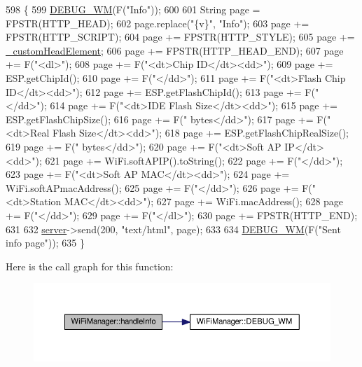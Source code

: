 \begin{DoxyCode}
598                              \{
599   \hyperlink{class_wi_fi_manager_ae5f595c670ccbcf9a191baf50f5c7c26}{DEBUG\_WM}(F(\textcolor{stringliteral}{"Info"}));
600 
601   String page = FPSTR(HTTP\_HEAD);
602   page.replace(\textcolor{stringliteral}{"\{v\}"}, \textcolor{stringliteral}{"Info"});
603   page += FPSTR(HTTP\_SCRIPT);
604   page += FPSTR(HTTP\_STYLE);
605   page += \hyperlink{class_wi_fi_manager_a8860012564a62209d750c50e56319192}{\_customHeadElement};
606   page += FPSTR(HTTP\_HEAD\_END);
607   page += F(\textcolor{stringliteral}{"<dl>"});
608   page += F(\textcolor{stringliteral}{"<dt>Chip ID</dt><dd>"});
609   page += ESP.getChipId();
610   page += F(\textcolor{stringliteral}{"</dd>"});
611   page += F(\textcolor{stringliteral}{"<dt>Flash Chip ID</dt><dd>"});
612   page += ESP.getFlashChipId();
613   page += F(\textcolor{stringliteral}{"</dd>"});
614   page += F(\textcolor{stringliteral}{"<dt>IDE Flash Size</dt><dd>"});
615   page += ESP.getFlashChipSize();
616   page += F(\textcolor{stringliteral}{" bytes</dd>"});
617   page += F(\textcolor{stringliteral}{"<dt>Real Flash Size</dt><dd>"});
618   page += ESP.getFlashChipRealSize();
619   page += F(\textcolor{stringliteral}{" bytes</dd>"});
620   page += F(\textcolor{stringliteral}{"<dt>Soft AP IP</dt><dd>"});
621   page += WiFi.softAPIP().toString();
622   page += F(\textcolor{stringliteral}{"</dd>"});
623   page += F(\textcolor{stringliteral}{"<dt>Soft AP MAC</dt><dd>"});
624   page += WiFi.softAPmacAddress();
625   page += F(\textcolor{stringliteral}{"</dd>"});
626   page += F(\textcolor{stringliteral}{"<dt>Station MAC</dt><dd>"});
627   page += WiFi.macAddress();
628   page += F(\textcolor{stringliteral}{"</dd>"});
629   page += F(\textcolor{stringliteral}{"</dl>"});
630   page += FPSTR(HTTP\_END);
631 
632   \hyperlink{class_wi_fi_manager_a509523a01c0395cf0dc235b074f2a5ea}{server}->send(200, \textcolor{stringliteral}{"text/html"}, page);
633 
634   \hyperlink{class_wi_fi_manager_ae5f595c670ccbcf9a191baf50f5c7c26}{DEBUG\_WM}(F(\textcolor{stringliteral}{"Sent info page"}));
635 \}
\end{DoxyCode}
Here is the call graph for this function\+:\nopagebreak
\begin{figure}[H]
\begin{center}
\leavevmode
\includegraphics[width=350pt]{d4/dc8/class_wi_fi_manager_ac35e46661f8a209d84bba62d9aa43a35_cgraph}
\end{center}
\end{figure}

